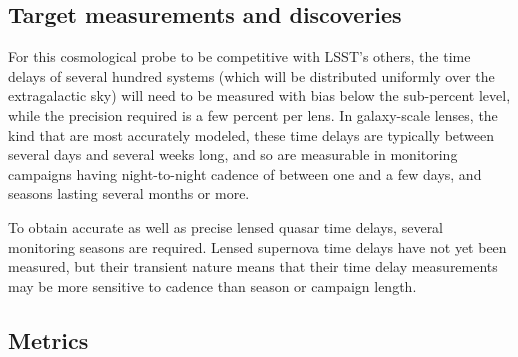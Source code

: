 
\subsection{Target measurements and discoveries}
\label{sec:\secname:targets}


For this cosmological probe to be competitive with LSST's others, the
time delays of several hundred systems (which will be distributed
uniformly over the extragalactic sky) will need to be measured with
bias below the sub-percent level, while the precision required is a
few percent per lens.  In galaxy-scale lenses, the kind that are most
accurately modeled, these time delays are typically between several
days and several weeks long, and so are measurable in monitoring
campaigns having night-to-night cadence of between one and a few days,
and seasons lasting several months or more.


To obtain accurate as well as precise lensed quasar time delays, several monitoring seasons are required. Lensed supernova time delays have not yet been measured, but their transient nature means that their time delay measurements may be more sensitive to cadence than season or campaign length.


\subsection{Metrics}
\label{sec:\secname:metrics}



